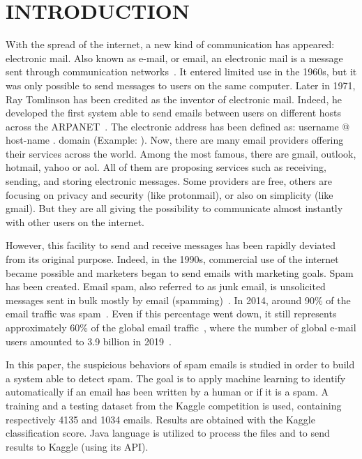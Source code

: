 \documentclass[runningheads]{llncs}
\begin{document}
\section{INTRODUCTION}
%
With the spread of the internet, a new kind of communication has appeared: electronic mail. Also known as e-mail, or email, an electronic mail is a message sent through communication networks~\cite{ref3}. It entered limited use in the 1960s, but it was only possible to send messages to users on the same computer. Later in 1971, Ray Tomlinson has been credited as the inventor of electronic mail. Indeed, he developed the first system able to send emails between users on different hosts across the ARPANET~\cite{ref5}. The electronic address has been defined as: username @ host-name . domain (Example: ). Now, there are many email providers offering their services across the world. Among the most famous, there are gmail, outlook, hotmail, yahoo or aol. All of them are proposing services such as receiving, sending, and storing electronic messages. Some providers are free, others are focusing on privacy and security (like protonmail), or also on simplicity (like gmail). But they are all giving the possibility to communicate almost instantly with other users on the internet. \\\par
However, this facility to send and receive messages has been rapidly deviated from its original purpose. Indeed, in the 1990s, commercial use of the internet became possible and marketers began to send emails with marketing goals. Spam has been created. Email spam, also referred to as junk email, is unsolicited messages sent in bulk mostly by email (spamming)~\cite{ref4}. In 2014, around 90\% of the email traffic was spam~\cite{ref6}. Even if this percentage went down, it still represents approximately 60\% of the global email traffic~\cite{ref1}, where the number of global e-mail users amounted to 3.9 billion in 2019~\cite{ref2}. \\\par
In this paper, the suspicious behaviors of spam emails is studied in order to build a system able to detect spam. The goal is to apply machine learning to identify automatically if an email has been written by a human or if it is a spam. A training and a testing dataset from the Kaggle competition is used, containing respectively 4135 and 1034 emails. Results are obtained with the Kaggle classification score. Java language is utilized to process the files and to send results to Kaggle (using its API).
%
%
%
\end{document}
